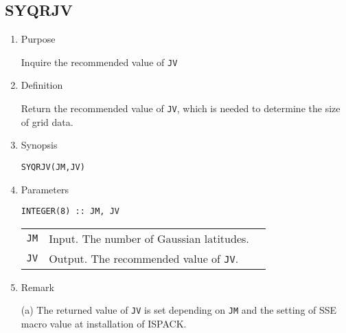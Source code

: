 \documentclass[a4paper]{scrartcl}
\begin{document}

\subsection{SYQRJV}

\begin{enumerate}

\item Purpose  

Inquire the recommended value of \texttt{JV}  

\item Definition

Return the recommended value of \texttt{JV}, which is
needed to determine the size of grid data.  

\item Synopsis 
    
\texttt{SYQRJV(JM,JV)}

\item Parameters  
  
\begin{verbatim}
INTEGER(8) :: JM, JV
\end{verbatim}    

\begin{tabular}{lll}
\texttt{JM}  & Input. The number of Gaussian latitudes.\\  
\texttt{JV} & Output. The recommended value of \texttt{JV}.
\end{tabular}

\item Remark

  (a) The returned value of \texttt{JV} is set depending on
\texttt{JM} and  the setting of SSE macro value at installation of ISPACK.

\end{enumerate}
\end{document}
